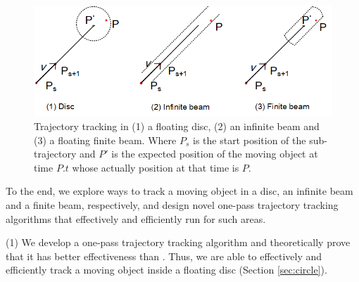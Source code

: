 

\begin{figure}[tb!]
	\centering
	\includegraphics[scale=1.0]{Figures/Fig-Areas.png}\vspace{-1ex}
	\vspace{-1ex}
	\caption{\small Trajectory tracking in (1) a floating disc, (2) an infinite beam \cite{Chen:Space,Daescu:metric} and (3) a floating finite beam. Where $P_s$ is the start position of the sub-trajectory and $P'$ is the expected position of the moving object at time $P.t$ whose actually position at that time is $P$.}
	\vspace{-3ex}
	\label{fig:areas}
\end{figure}

To the end, we explore ways to track a moving object in a disc, an infinite beam and a finite beam, respectively, and design novel one-pass trajectory tracking algorithms that effectively and efficiently run for such areas. 

\ni (1) We develop a one-pass trajectory tracking algorithm \citt and theoretically prove that it has better effectiveness than \ldrh. Thus, we are able to effectively and efficiently track a moving object inside a floating disc (Section \ref{sec:circle}).


